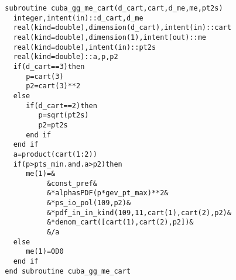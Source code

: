 \begin{Verbatim}
  subroutine cuba_gg_me_cart(d_cart,cart,d_me,me,pt2s)
    integer,intent(in)::d_cart,d_me
    real(kind=double),dimension(d_cart),intent(in)::cart
    real(kind=double),dimension(1),intent(out)::me
    real(kind=double),intent(in)::pt2s
    real(kind=double)::a,p,p2
    if(d_cart==3)then
       p=cart(3)
       p2=cart(3)**2
    else
       if(d_cart==2)then
          p=sqrt(pt2s)
          p2=pt2s
       end if
    end if
    a=product(cart(1:2))
    if(p>pts_min.and.a>p2)then
       me(1)=&
            &const_pref&
            &*alphasPDF(p*gev_pt_max)**2&
            &*ps_io_pol(109,p2)&
            &*pdf_in_in_kind(109,11,cart(1),cart(2),p2)&
            &*denom_cart([cart(1),cart(2),p2])&
            &/a
    else
       me(1)=0D0
    end if
  end subroutine cuba_gg_me_cart
\end{Verbatim}

